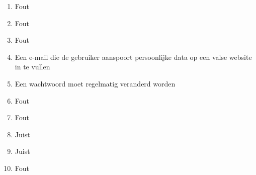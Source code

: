 \begin{enumerate}
  \item Fout
  \item Fout
  \item Fout
  \item Een e-mail die de gebruiker aanspoort persoonlijke data op een valse website in te vullen
  \item Een wachtwoord moet regelmatig veranderd worden
  \item Fout
  \item Fout
  \item Juist
  \item Juist
  \item Fout
\end{enumerate}